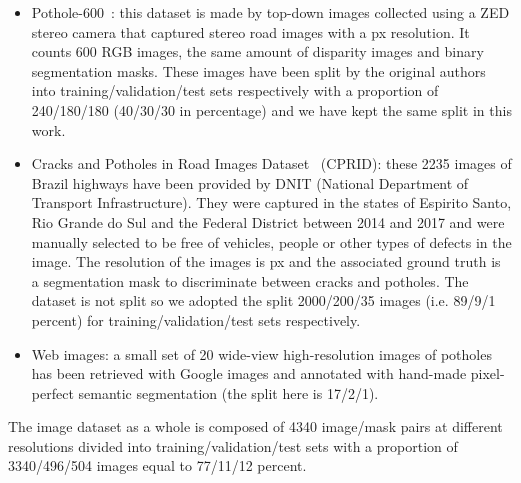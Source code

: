 \documentclass[twocolumn]{article}
\begin{document}
\begin{itemize}
    \item Pothole-600~\cite{Pothole-600_1,Pothole-600_2,Pothole-600_3,Pothole-600_4}: this dataset is made by top-down images collected using a ZED stereo camera that captured stereo road images with a  px resolution. It counts 600 RGB images, the same amount of disparity images and binary segmentation masks. These images have been split by the original authors into training/validation/test sets respectively with a proportion of 240/180/180 (40/30/30 in percentage) and we have kept the same split in this work.
    \item Cracks and Potholes in Road Images Dataset~\cite{CaPiRID} (CPRID): these 2235 images of Brazil highways have been provided by DNIT (National Department of Transport Infrastructure). They were captured in the states of Espirito Santo, Rio Grande do Sul and the Federal District between 2014 and 2017 and were manually selected to be free of vehicles, people or other types of defects in the image. The resolution of the images is  px and the associated ground truth is a segmentation mask to discriminate between cracks and potholes. The dataset is not split so we adopted the split 2000/200/35 images (i.e. 89/9/1 percent) for training/validation/test sets respectively.
    \item Web images: a small set of 20 wide-view high-resolution images of potholes has been retrieved with Google images and annotated with hand-made pixel-perfect semantic segmentation (the split here is 17/2/1).
\end{itemize}

The image dataset as a whole is composed of 4340 image/mask pairs at different resolutions divided into training/validation/test sets with a proportion of 3340/496/504 images equal to 77/11/12 percent.
\end{document}
